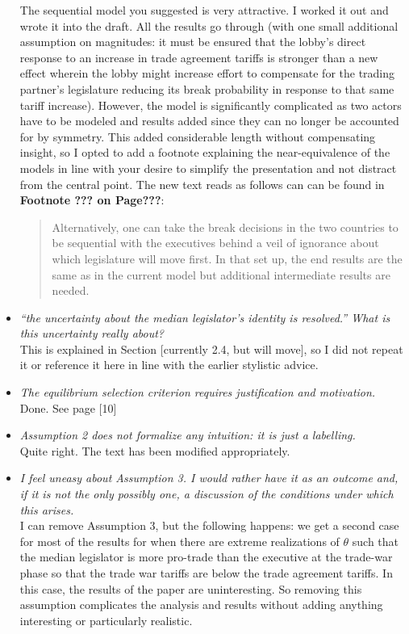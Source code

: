 \documentclass[12pt]{report}
\begin{document}
\begin{itemize}
	The sequential model you suggested is very attractive. I worked it out and wrote it into the draft. All the results go through (with one small additional assumption on magnitudes: it must be ensured that the lobby's direct response to an increase in trade agreement tariffs is stronger than a new effect wherein the lobby might increase effort to compensate for the trading partner's legislature reducing its break probability in response to that same tariff increase). However, the model is significantly complicated as two actors have to be modeled and results added since they can no longer be accounted for by symmetry. This added considerable length without compensating insight, so I opted to add a footnote explaining the near-equivalence of the models in line with your desire to simplify the presentation and not distract from the central point. The new text reads as follows can can be found in \textbf{Footnote ??? on Page???}:
	\begin{quote}
		Alternatively, one can take the break decisions in the two countries to be sequential with the executives behind a veil of ignorance about which legislature will move first. In that set up, the end results are the same as in the current model but additional intermediate results are needed.
	\end{quote}
	
  \item \textit{``the uncertainty about the median legislator's identity is resolved.'' What is this uncertainty really about?} \\
	This is explained in Section [currently 2.4, but will move], so I did not repeat it or reference it here in line with the earlier stylistic advice.
	
  \item \textit{The equilibrium selection criterion requires justification and motivation.} \\
	Done. See page [10]
	
  \item \textit{Assumption 2 does not formalize any intuition: it is just a labelling.} \\
	Quite right. The text has been modified appropriately.
  \item \textit{I feel uneasy about Assumption 3. I would rather have it as an outcome and, if it is not the only possibly one, a discussion of the conditions under which this arises.} \\
	I can remove Assumption 3, but the following happens: we get a second case for most of the results for when there are extreme realizations of $\theta$ such that the median legislator is more pro-trade than the executive at the trade-war phase so that the trade war tariffs are below the trade agreement tariffs. In this case, the results of the paper are uninteresting. So removing this assumption complicates the analysis and results without adding anything interesting or particularly realistic.
	

\end{itemize}
\end{document}
